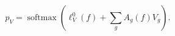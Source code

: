 \begin{equation}
p_V=\operatorname{softmax}\!\left(\ell_V^0(f)+\sum_g A_g(f)V_g\right).\tag{4}\label{eq:original-4}
\end{equation}
